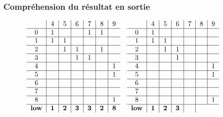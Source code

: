 \documentclass{beamer}
\begin{document}
\begin{frame}
    \frametitle{Compréhension du résultat en sortie}
    \begin{figure}
        \fontsize{6}{8}\selectfont
        \begin{math}
        \begin{array}{cc}
            \begin{tabular}{ c | c | c | c | c | c | c }
                  & 4 & 5 & 6 & 7 & 8 & 9 \\ \hline
                0 & 1 &   &   & 1 & 1 &   \\ \hline
                1 & 1 & 1 &   &   &   &   \\ \hline
                2 &   & 1 & 1 &   & 1 &   \\ \hline
                3 &   &   & 1 & 1 &   &   \\ \hline
                4 &   &   &   &   &   & 1 \\ \hline
                5 &   &   &   &   &   & 1 \\ \hline
                6 &   &   &   &   &   &   \\ \hline
                7 &   &   &   &   &   &   \\ \hline
                8 &   &   &   &   &   & 1 \\ \hline
                \textbf{low} & \textbf{1} & \textbf{2} & \textbf{3} & 
                \textbf{3} & \textbf{2} & \textbf{8}
            \end{tabular} & 
            \begin{tabular}{ c | c | c | c | c | c | c }
                  & 4 & 5 & 6 & 7 & 8 & 9 \\ \hline
                0 & 1 &   &   &   &   &   \\ \hline
                1 & 1 & 1 &   &   &   &   \\ \hline
                2 &   & 1 & 1 &   &   &   \\ \hline
                3 &   &   & 1 &   &   &   \\ \hline
                4 &   &   &   &   &   & 1 \\ \hline
                5 &   &   &   &   &   & 1 \\ \hline
                6 &   &   &   &   &   &   \\ \hline
                7 &   &   &   &   &   &   \\ \hline
                8 &   &   &   &   &   & 1  \\ \hline
                \textbf{low} & \textbf{1} & \textbf{2} & \textbf{3} & 

\end{tabular}
\end{array}
\end{math}
\end{figure}
\end{frame}
\end{document}

